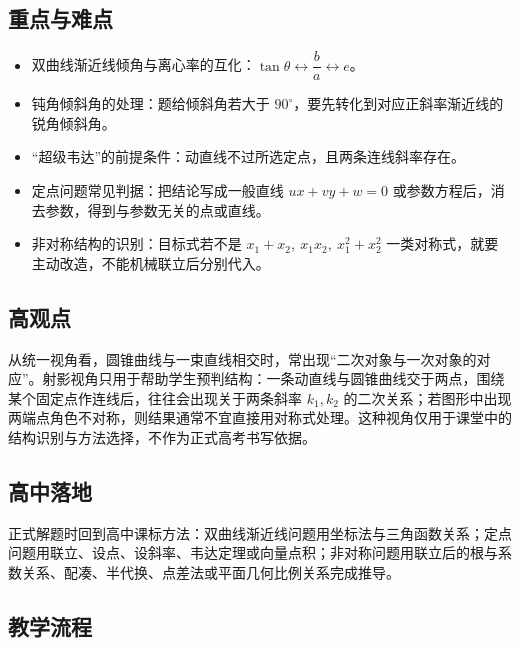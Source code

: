 \documentclass[UTF8,a4paper,11pt]{ctexart}
\begin{document}
\subsection*{重点与难点}

\begin{itemize}

\item 双曲线渐近线倾角与离心率的互化：$\tan\theta \leftrightarrow \dfrac{b}{a} \leftrightarrow e$。

\item 钝角倾斜角的处理：题给倾斜角若大于 $90^\circ$，要先转化到对应正斜率渐近线的锐角倾斜角。

\item “超级韦达”的前提条件：动直线不过所选定点，且两条连线斜率存在。

\item 定点问题常见判据：把结论写成一般直线 $ux+vy+w=0$ 或参数方程后，消去参数，得到与参数无关的点或直线。

\item 非对称结构的识别：目标式若不是 $x_1+x_2,\ x_1x_2,\ x_1^2+x_2^2$ 一类对称式，就要主动改造，不能机械联立后分别代入。

\end{itemize}

\subsection*{高观点}

从统一视角看，圆锥曲线与一束直线相交时，常出现“二次对象与一次对象的对应”。射影视角只用于帮助学生预判结构：一条动直线与圆锥曲线交于两点，围绕某个固定点作连线后，往往会出现关于两条斜率 $k_1,k_2$ 的二次关系；若图形中出现两端点角色不对称，则结果通常不宜直接用对称式处理。这种视角仅用于课堂中的结构识别与方法选择，不作为正式高考书写依据。

\subsection*{高中落地}

正式解题时回到高中课标方法：双曲线渐近线问题用坐标法与三角函数关系；定点问题用联立、设点、设斜率、韦达定理或向量点积；非对称问题用联立后的根与系数关系、配凑、半代换、点差法或平面几何比例关系完成推导。

\subsection*{教学流程}
\end{document}
